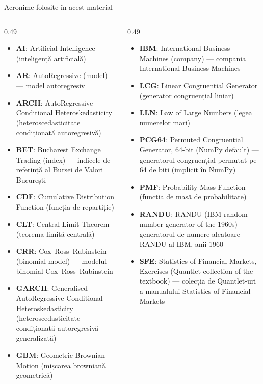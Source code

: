 \begin{frame}{Acronime folosite în acest material}
\begin{columns}[T]
\begin{column}{0.49\textwidth}
\begin{itemize}\setlength{\itemsep}{0pt}
    \item \textbf{AI}: Artificial Intelligence (inteligență artificială)
    \item \textbf{AR}: AutoRegressive (model) — model autoregresiv
    \item \textbf{ARCH}: AutoRegressive Conditional Heteroskedasticity (heteroscedasticitate condiționată autoregresivă)
    \item \textbf{BET}: Bucharest Exchange Trading (index) — indicele de referință al Bursei de Valori București
    \item \textbf{CDF}: Cumulative Distribution Function (funcția de repartiție)
    \item \textbf{CLT}: Central Limit Theorem (teorema limită centrală)
    \item \textbf{CRR}: Cox–Ross–Rubinstein (binomial model) — modelul binomial Cox–Ross–Rubinstein
    \item \textbf{GARCH}: Generalised AutoRegressive Conditional Heteroskedasticity (heteroscedasticitate condiționată autoregresivă generalizată)
    \item \textbf{GBM}: Geometric Brownian Motion (mișcarea browniană geometrică)
\end{itemize}
\end{column}
\begin{column}{0.49\textwidth}
\begin{itemize}\setlength{\itemsep}{0pt}
    \item \textbf{IBM}: International Business Machines (company) — compania International Business Machines
    \item \textbf{LCG}: Linear Congruential Generator (generator congruențial liniar)
    \item \textbf{LLN}: Law of Large Numbers (legea numerelor mari)
    \item \textbf{PCG64}: Permuted Congruential Generator, 64-bit (NumPy default) — generatorul congruențial permutat pe 64 de biți (implicit în NumPy)
    \item \textbf{PMF}: Probability Mass Function (funcția de masă de probabilitate)
    \item \textbf{RANDU}: RANDU (IBM random number generator of the 1960s) — generatorul de numere aleatoare RANDU al IBM, anii 1960
    \item \textbf{SFE}: Statistics of Financial Markets, Exercises (Quantlet collection of the textbook) — colecția de Quantlet-uri a manualului Statistics of Financial Markets
\end{itemize}
\end{column}
\end{columns}
\end{frame}

